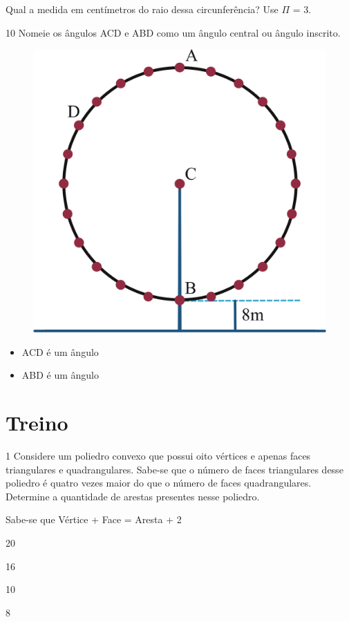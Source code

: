 Qual a medida em centímetros do raio dessa circunferência? Use $\Pi$ = 3. 


\pagebreak
\num{10} Nomeie os ângulos ACD e ABD como um ângulo central ou ângulo
inscrito.

\begin{figure}[htpb!]
\centering
\includegraphics[width=.5\textwidth]{./ilustras-mat/modulo_10_-atividade_10.png}
\end{figure}


\begin{itemize}
\item ACD é um ângulo 

\item ABD é um ângulo 
\end{itemize}

\section{Treino}

\num{1} Considere um poliedro convexo que possui oito vértices e apenas faces
triangulares e quadrangulares. Sabe-se que o número de faces
triangulares desse poliedro é quatro vezes maior do que o número de
faces quadrangulares. Determine a quantidade de arestas presentes nesse
poliedro.

Sabe-se que Vértice + Face = Aresta + 2

\begin{escolha}
  \item 20

  \item 16

  \item 10

  \item 8
\end{escolha}

